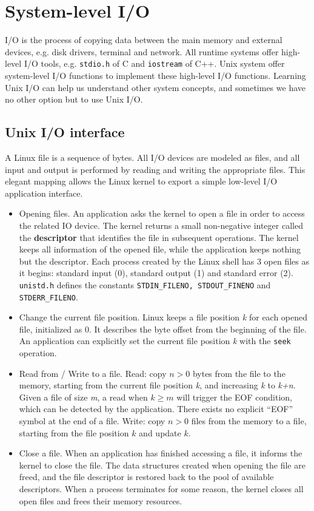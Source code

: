 \ifx\PREAMBLE\undefined


\fi
\newpage
\section{System-level I/O}
I/O is the process of copying data between the main memory and external devices, e.g. disk drivers, terminal and network. All runtime systems offer high-level I/O tools, e.g. \texttt{stdio.h} of C and \texttt{iostream} of C++. Unix system offer system-level I/O functions to implement these high-level I/O functions. Learning Unix I/O can help us understand other system concepts, and sometimes we have no other option but to use Unix I/O.
\subsection{Unix I/O interface}
A Linux file is a sequence of bytes. All I/O devices are modeled as files, and all input and output is performed by reading and writing the appropriate files. This elegant mapping allows the Linux kernel to export a simple low-level I/O application interface.
\begin{itemize}
	\item Opening files. An application asks the kernel to open a file in order to access the related IO device. The kernel returns a small non-negative integer called the \textbf{descriptor} that identifies the file in subsequent operations. The kernel keeps all information of the opened file, while the application keeps nothing but the descriptor. Each process created by the Linux shell has 3 open files as it begins: standard input (0), standard output (1) and standard error (2). \texttt{unistd.h} defines the constants \texttt{STDIN\_FILENO, STDOUT\_FINENO} and \texttt{STDERR\_FILENO}.
	\item Change the current file position. Linux keeps a file position \emph{k} for each opened file, initialized as 0. It describes the byte offset from the beginning of the file. An application can explicitly set the current file position \emph{k} with the \texttt{seek} operation.
	\item Read from / Write to a file. Read: copy $n>0$ bytes from the file to the memory, starting from the current file position \emph{k}, and increasing \emph{k} to \emph{k+n}. Given a file of size \emph{m}, a read when $k\ge m$ will trigger the EOF condition, which can be detected by the application. There exists no explicit ``EOF'' symbol at the end of a file. Write: copy $n>0$ files from the memory to a file, starting from the file position $k$ and update $k$.
	\item Close a file. When an application has finished accessing a file, it informs the kernel to close the file. The data structures created when opening the file are freed, and the file descriptor is restored back to the pool of available descriptors. When a process terminates for some reason, the kernel closes all open files and frees their memory resources.
\end{itemize}
